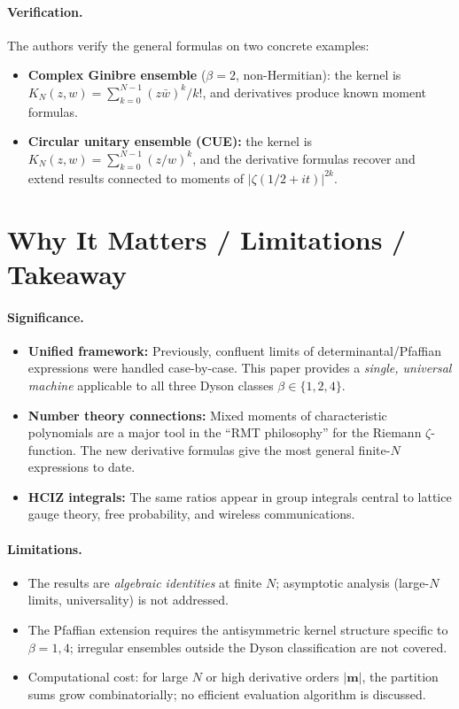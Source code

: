 \documentclass[11pt,a4paper]{article}
\theoremstyle{definition}
\begin{document}
\paragraph{Verification.}  The authors verify the general formulas on two concrete examples:
\begin{itemize}[nosep]
  \item \textbf{Complex Ginibre ensemble} ($\beta=2$, non-Hermitian): the kernel is $K_N(z,w)=\sum_{k=0}^{N-1}(z\bar w)^k/k!$, and derivatives produce known moment formulas.
  \item \textbf{Circular unitary ensemble (CUE):} the kernel is $K_N(z,w)=\sum_{k=0}^{N-1}(z/w)^k$, and the derivative formulas recover and extend results connected to moments of $|\zeta(1/2+it)|^{2k}$.
\end{itemize}

\section{Why It Matters / Limitations / Takeaway}

\paragraph{Significance.}
\begin{itemize}[nosep]
  \item \textbf{Unified framework:} Previously, confluent limits of determinantal/Pfaffian expressions were handled case-by-case.  This paper provides a \emph{single, universal machine} applicable to all three Dyson classes $\beta\in\{1,2,4\}$.
  \item \textbf{Number theory connections:} Mixed moments of characteristic polynomials are a major tool in the ``RMT philosophy'' for the Riemann $\zeta$-function.  The new derivative formulas give the most general finite-$N$ expressions to date.
  \item \textbf{HCIZ integrals:} The same ratios appear in group integrals central to lattice gauge theory, free probability, and wireless communications.
\end{itemize}

\paragraph{Limitations.}
\begin{itemize}[nosep]
  \item The results are \emph{algebraic identities} at finite $N$; asymptotic analysis (large-$N$ limits, universality) is not addressed.
  \item The Pfaffian extension requires the antisymmetric kernel structure specific to $\beta=1,4$; irregular ensembles outside the Dyson classification are not covered.
  \item Computational cost: for large $N$ or high derivative orders $|\mathbf{m}|$, the partition sums grow combinatorially; no efficient evaluation algorithm is discussed.
\end{itemize}
\end{document}

